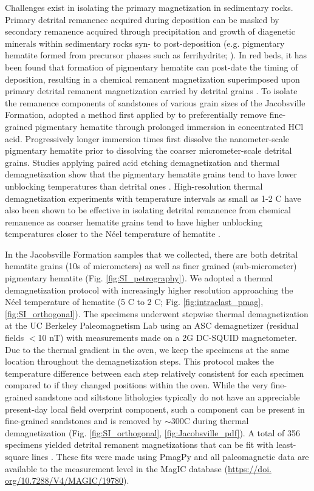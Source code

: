 Challenges exist in isolating the primary magnetization in sedimentary rocks. Primary detrital remanence acquired during deposition can be masked by secondary remanence acquired through precipitation and growth of diagenetic minerals within sedimentary rocks syn- to post-deposition (e.g. pigmentary hematite formed from precursor phases such as ferrihydrite; \citealp{Jiang2018a}). In red beds, it has been found that formation of pigmentary hematite can post-date the timing of deposition, resulting in a chemical remanent magnetization superimposed upon primary detrital remanent magnetization carried by detrital grains \citep{Collinson1974a, Tauxe1980a}. To isolate the remanence components of sandstones of various grain sizes of the Jacobsville Formation, \cite{Roy1978a} adopted a method first applied by \cite{Collinson1965c} to preferentially remove fine-grained pigmentary hematite through prolonged immersion in concentrated HCl acid. Progressively longer immersion times first dissolve the nanometer-scale pigmentary hematite prior to dissolving the coarser micrometer-scale detrital grains. Studies applying paired acid etching demagnetization and thermal demagnetization show that the pigmentary hematite grains tend to have lower unblocking temperatures than detrital ones \citep{Tauxe1980a, Bilardello2010c}. High-resolution thermal demagnetization experiments with temperature intervals as small as 1-2 \textdegree C have also been shown to be effective in isolating detrital remanence from chemical remanence as coarser hematite grains tend to have higher unblocking temperatures closer to the N\'eel temperature of hematite \citep{Jiang2015a,Swanson-Hysell2019b}. 

In the Jacobsville Formation samples that we collected, there are both detrital hematite grains (10s of micrometers) as well as finer grained (sub-micrometer) pigmentary hematite (Fig. \ref{fig:SI_petrography}). We adopted a thermal demagnetization protocol with increasingly higher resolution approaching the N\'eel temperature of hematite (5 \textdegree C to 2 \textdegree C; Fig. \ref{fig:intraclast_pmag}, \ref{fig:SI_orthogonal}). The specimens underwent stepwise thermal demagnetization at the UC Berkeley Paleomagnetism Lab using an ASC demagnetizer (residual fields $<$10 nT) with measurements made on a 2G DC-SQUID magnetometer. Due to the thermal gradient in the oven, we keep the specimens at the same location throughout the demagnetization steps. This protocol makes the temperature difference between each step relatively consistent for each specimen compared to if they changed positions within the oven. While the very fine-grained sandstone and siltstone lithologies typically do not have an appreciable present-day local field overprint component, such a component can be present in fine-grained sandstones and is removed by $\sim$300\textdegree C during thermal demagnetization (Fig. \ref{fig:SI_orthogonal}, \ref{fig:Jacobsville_pdf}). A total of 356 specimens yielded detrital remanent magnetizations that can be fit with least-square lines \citep{Kirschvink1980a}. These fits were made using PmagPy \citep{Tauxe2016a} and all paleomagnetic data are available to the measurement level in the MagIC database (\url{https://doi. org/10.7288/V4/MAGIC/19780}).

